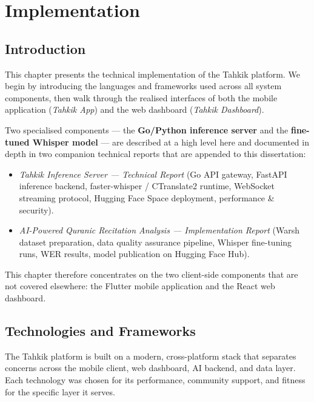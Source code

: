 \chapter{Implementation}
\label{ch:implementation}

\section{Introduction}
This chapter presents the technical implementation of the Tahkik platform. We begin by introducing the languages and frameworks used across all system components, then walk through the realised interfaces of both the mobile application (\textit{Tahkik App}) and the web dashboard (\textit{Tahkik Dashboard}).

\begin{infobox}[title=Scope of this Chapter]
Two specialised components --- the \textbf{Go/Python inference server} and the \textbf{fine-tuned Whisper model} --- are described at a high level here and documented in depth in two companion technical reports that are appended to this dissertation:
\begin{itemize}[leftmargin=2em]
  \item \textit{Tahkik Inference Server --- Technical Report} (Go API gateway, FastAPI inference backend, faster-whisper / CTranslate2 runtime, WebSocket streaming protocol, Hugging Face Space deployment, performance \& security).
  \item \textit{AI-Powered Quranic Recitation Analysis --- Implementation Report} (Warsh dataset preparation, data quality assurance pipeline, Whisper fine-tuning runs, WER results, model publication on Hugging Face Hub).
\end{itemize}
This chapter therefore concentrates on the two client-side components that are not covered elsewhere: the Flutter mobile application and the React web dashboard.
\end{infobox}

\section{Technologies and Frameworks}
\label{sec:impl_tech}

\begin{emeraldbox}[title=Technology Stack]
The Tahkik platform is built on a modern, cross-platform stack that separates concerns across the mobile client, web dashboard, AI backend, and data layer. Each technology was chosen for its performance, community support, and fitness for the specific layer it serves.
\end{emeraldbox}

